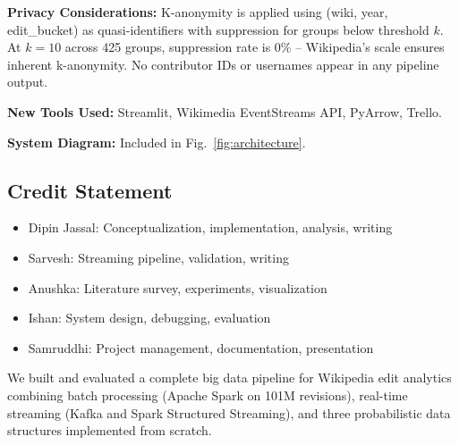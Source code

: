 \documentclass[conference]{IEEEtran}
\begin{document}
\textbf{Privacy Considerations:}
K-anonymity is applied using (wiki, year, edit\_bucket) as quasi-identifiers with suppression for groups below threshold $k$. At $k=10$ across 425 groups, suppression rate is 0\% -- Wikipedia's scale ensures inherent k-anonymity. No contributor IDs or usernames appear in any pipeline output.

\textbf{New Tools Used:}  
Streamlit, Wikimedia EventStreams API, PyArrow, Trello.

\textbf{System Diagram:}  
Included in Fig.~\ref{fig:architecture}.

\subsection*{Credit Statement}

\begin{itemize}
    \item Dipin Jassal: Conceptualization, implementation, analysis, writing
    \item Sarvesh: Streaming pipeline, validation, writing
    \item Anushka: Literature survey, experiments, visualization
    \item Ishan: System design, debugging, evaluation
    \item Samruddhi: Project management, documentation, presentation
\end{itemize}

We built and evaluated a complete big data pipeline for Wikipedia edit analytics combining batch processing (Apache Spark on 101M revisions), real-time streaming (Kafka and Spark Structured Streaming), and three probabilistic data structures implemented from scratch.
\end{document}
